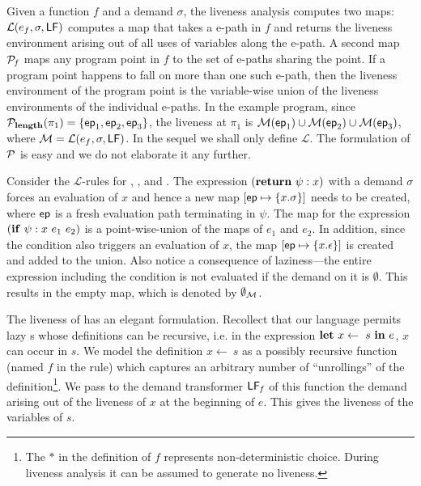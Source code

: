 \documentclass[9pt]{sigplanconf}
\begin{document}
Given  a function  $\mathit{f}$ and  a demand  $\sigma$,  the liveness
analysis  computes  two   maps:  $\mathcal{L}(e_f,  \sigma,  \mathsf{LF})$
computes a  map that takes a  e-path in ${\mathit f}$  and returns the
liveness environment  arising out of  all uses of variables  along the
e-path.  A second map $\cal{P}_{\mathit  f}$ maps any program point in
$\mathit f$  to the set  of e-paths sharing  the point.  If  a program
point happens to fall on more  than one such e-path, then the liveness
environment of  the program  point is the  variable-wise union  of the
liveness  environments  of the  individual  e-paths.   In the  example
program,  since ${\mathcal P}_{\mathbf{length}}(\pi_1)  = \lbrace  \mathsf{ep}_1, \mathsf{ep}_2,
\mathsf{ep}_3\rbrace$, the  liveness at $\pi_1$  is ${\cal M}(\mathsf{ep}_1)  \cup {\cal
  M}(\mathsf{ep}_2) \cup  {\cal M}(\mathsf{ep}_3)$,  where ${\cal M}  = \mathcal{L}(e_f,
\sigma, \mathsf{LF})$.  In the  sequel we shall only define $\mathcal{L}$.
The formulation  of $\cal{P}$ is easy  and we do not  elaborate it any
further.

Consider the  $\mathcal{L}$-rules for {\LET}, {\SIF},  and {\SRETURN}.
The expression  $(\mbox{$\mathbf{ return}$}~\psi:x)$ with  a demand $\sigma$  forces an
evaluation  of  $x$ and  hence  a  new map  $[\mathit{\mathsf{ep}}  \mapsto
  \{x.\sigma\}]  $ needs  to be  created,  where $\mathsf{ep}$  is a  fresh
evaluation path  terminating in  $\psi$.  The  map for  the expression
$(\mbox{$\mathbf{ if}$}~\psi:x~e_1~e_2)$ is a point-wise-union of the maps of $e_1$ and
$e_2$. In addition, since the condition also triggers an evaluation of
$x$, the map $[\mathit{\mathsf{ep}} \mapsto \{x.\epsilon\}]$ is created and
added  to the  union.   Also notice  a  consequence of  laziness---the
entire  expression including  the condition  is not  evaluated if  the
demand on it is $\emptyset$.  This  results in the empty map, which is
denoted by $\emptyset_{\cal{M}}$.



 The liveness  of {\LET} has  an elegant formulation.   Recollect that
 our language permits lazy {\LET}s whose definitions can be recursive,
 i.e.  in the expression $\mbox{$\mathbf{ let}$}~x \leftarrow~s~\mbox{$\mathbf{ in}$}~e$, $x$ can occur in
 $s$.   We  model  the  definition  $x  \leftarrow~s$  as  a  possibly
 recursive function (named $\mathit{f}$ in the rule) which captures an
 arbitrary number of ``unrollings'' of the definition\footnote{The $*$
   in  the definition  of ${\mathit  f}$ represents  non-deterministic
   choice.  During liveness analysis it  can be assumed to generate no
   liveness.}.  We  pass to  the demand  transformer $\mathsf{LF}_{\mathit
   f}$ of this function the demand  arising out of the liveness of $x$
 at the beginning of $e$. This  gives the liveness of the variables of
 $s$.
\end{document}
